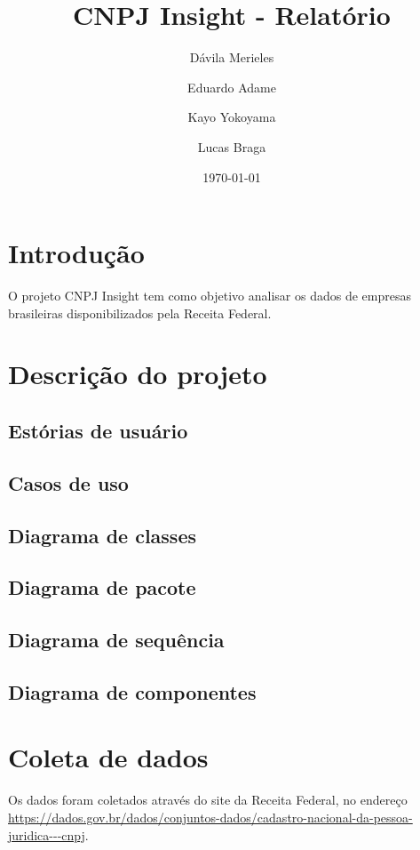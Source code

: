 \documentclass{article}
\title{CNPJ Insight - Relatório}
\author{Dávila Merieles \and Eduardo Adame \and Kayo Yokoyama \and Lucas Braga}
\date{\today}
\begin{document}
\maketitle

\section{Introdução}

O projeto CNPJ Insight tem como objetivo analisar os dados de empresas brasileiras disponibilizados pela Receita Federal. 

\section{Descrição do projeto}

\subsection{Estórias de usuário}

\subsection{Casos de uso}

\subsection{Diagrama de classes}

\subsection{Diagrama de pacote}

\subsection{Diagrama de sequência}

\subsection{Diagrama de componentes}

\section{Coleta de dados}

Os dados foram coletados através do site da Receita Federal, no endereço \url{https://dados.gov.br/dados/conjuntos-dados/cadastro-nacional-da-pessoa-juridica---cnpj}.
\end{document}

